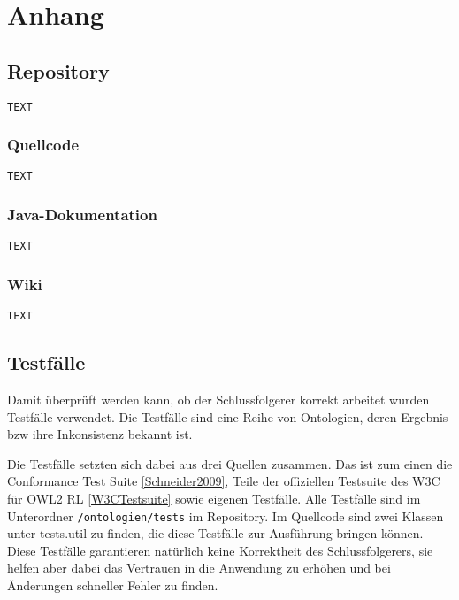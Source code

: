 \chapter{Anhang}

\section{Repository}
\begin{verbatim}
TEXT
\end{verbatim}

\subsection{Quellcode}
\begin{verbatim}
TEXT
\end{verbatim}

\subsection{Java-Dokumentation}
\begin{verbatim}
TEXT
\end{verbatim}

\subsection{Wiki}
\begin{verbatim}
TEXT
\end{verbatim}

\section{Testfälle}
Damit überprüft werden kann, ob der Schlussfolgerer korrekt arbeitet wurden Testfälle verwendet. Die Testfälle sind eine Reihe von Ontologien, deren Ergebnis bzw ihre Inkonsistenz bekannt ist.

Die Testfälle setzten sich dabei aus drei Quellen zusammen. Das ist zum einen die Conformance Test Suite \ref{Schneider2009}, Teile der offiziellen Testsuite des W3C für OWL2 RL \ref{W3CTestsuite} sowie eigenen Testfälle. Alle Testfälle sind im Unterordner \texttt{/ontologien/tests} im Repository. Im Quellcode sind zwei Klassen unter tests.util zu finden, die diese Testfälle zur Ausführung bringen können. Diese Testfälle garantieren natürlich keine Korrektheit des Schlussfolgerers, sie helfen aber dabei das Vertrauen in die Anwendung zu erhöhen und bei Änderungen schneller Fehler zu finden.

